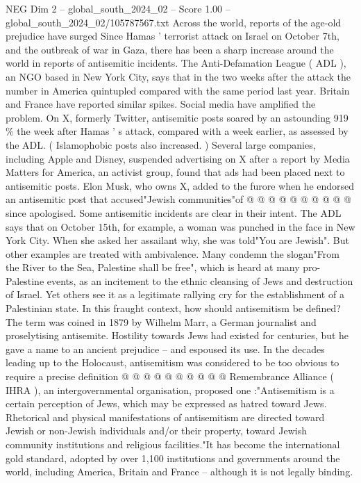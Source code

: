 \begin{textsample}{NEG Dim 2 – global\_south\_2024\_02 – Score 1.00 – global\_south\_2024\_02/105787567.txt}  \label{ex:f2_neg_247}
Across the world, reports of the age-old prejudice have surged Since Hamas ' terrorist attack on Israel on October 7th, and the outbreak of war in Gaza, there has been a sharp increase around the world in reports of antisemitic incidents.
The Anti-Defamation League ( ADL ), an NGO based in New York City, says that in the two weeks after the attack the number in America quintupled compared with the same period last year.
Britain and France have reported similar spikes.
Social media have amplified the problem.
On X, formerly Twitter, antisemitic posts soared by an astounding 919 \% the week after Hamas ' s attack, compared with a week earlier, as assessed by the ADL. ( Islamophobic posts also increased. ) Several large companies, including Apple and Disney, suspended advertising on X after a report by Media Matters for America, an activist group, found that ads had been placed next to antisemitic posts.
Elon Musk, who owns X, added to the furore when he endorsed an antisemitic post that accused"Jewish communities"of @ @ @ @ @ @ @ @ @ @ since apologised.
Some antisemitic incidents are clear in their intent.
The ADL says that on October 15th, for example, a woman was punched in the face in New York City.
When she asked her assailant why, she was told"You are Jewish".
But other examples are treated with ambivalence.
Many condemn the slogan"From the River to the Sea, Palestine shall be free", which is heard at many pro-Palestine events, as an incitement to the ethnic cleansing of Jews and destruction of Israel.
Yet others see it as a legitimate rallying cry for the establishment of a Palestinian state.
In this fraught context, how should antisemitism be defined?
The term was coined in 1879 by Wilhelm Marr, a German journalist and proselytising antisemite.
Hostility towards Jews had existed for centuries, but he gave a name to an ancient prejudice -- and espoused its use.
In the decades leading up to the Holocaust, antisemitism was considered to be too obvious to require a precise definition @ @ @ @ @ @ @ @ @ @ Remembrance Alliance ( IHRA ), an intergovernmental organisation, proposed one :"Antisemitism is a certain perception of Jews, which may be expressed as hatred toward Jews.
Rhetorical and physical manifestations of antisemitism are directed toward Jewish or non-Jewish individuals and/or their property, toward Jewish community institutions and religious facilities."It has become the international gold standard, adopted by over 1,100 institutions and governments around the world, including America, Britain and France -- although it is not legally binding.

\end{textsample}
